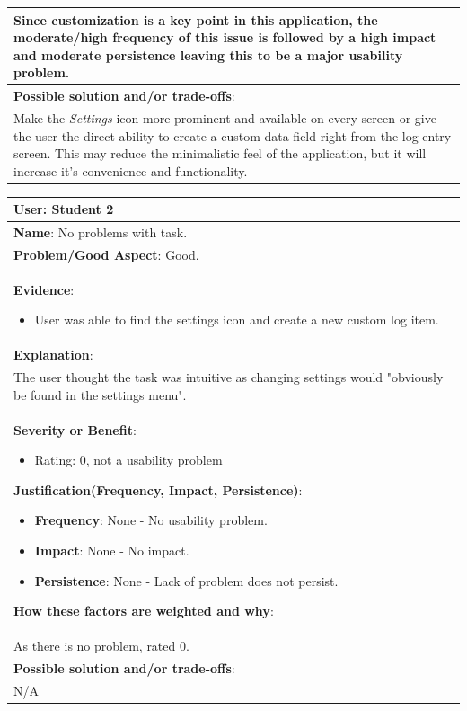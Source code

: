 \documentclass[pdftex,12pt,a4paper]{report}
\begin{document}
\begin{center}
\begin{tabular}{|p{\textwidth}|}
	Since customization is a key point in this application, the moderate/high frequency of this issue is followed by a high impact and moderate persistence leaving this to be a major usability problem.\\
	\hline
	\textbf{Possible solution and/or trade-offs}:\\
	Make the \emph{Settings} icon more prominent and available on every screen or give the user the direct ability to create a custom data field right from the log entry screen. This may reduce the minimalistic feel of the application, but it will increase it's convenience and functionality.\\
	\hline
	\end{tabular}
\end{center}

\begin{center}
	\begin{tabular}{|p{\textwidth}|}
	\hline
	\textbf{User}: Student 2\\
	\hline
	\textbf{Name}: No problems with task.\\
	\hline
	\textbf{Problem/Good Aspect}: Good.\\
	\hline
	\textbf{Evidence}:
	\begin{itemize}
	\item{User was able to find the settings icon and create a new custom log item.}
	\end{itemize}\\
	\hline
	\textbf{Explanation}:\\The user thought the task was intuitive as changing settings would "obviously be found in the settings menu".\\
	\hline
\textbf{Severity or Benefit}:
	\begin{itemize}
	\item{Rating: 0, not a usability problem}
	\end{itemize}
	\textbf{Justification(Frequency, Impact, Persistence)}:
	\begin{itemize}
	\item{\textbf{Frequency}:} None - No usability problem.
	\item{\textbf{Impact}:} None - No impact.
	\item{\textbf{Persistence}:} None - Lack of problem does not persist.
	\end{itemize}
	\textbf{How these factors are weighted and why}:\\
	As there is no problem, rated 0.\\
	\hline
	\textbf{Possible solution and/or trade-offs}:\\
	N/A\\
	\hline
	\end{tabular}
\end{center}
\end{document}
